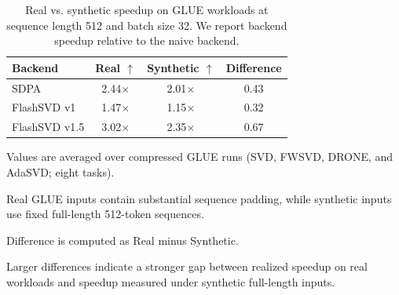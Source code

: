 \begin{table}[t]
\centering
\small
\setlength{\tabcolsep}{29pt}
\renewcommand{\arraystretch}{1.08}
\begin{threeparttable}
\caption{
Real vs. synthetic speedup on GLUE workloads at sequence length 512 and batch size 32.
We report backend speedup relative to the naive backend.
}
\label{tab:real_vs_synth_gap}
\begin{tabular}{lccc}
\toprule
Backend & Real $\uparrow$ & Synthetic $\uparrow$ & Difference \\
\midrule
SDPA          & 2.44$\times$ & 2.01$\times$ & 0.43 \\
FlashSVD v1   & 1.47$\times$ & 1.15$\times$ & 0.32 \\
FlashSVD v1.5 & 3.02$\times$ & 2.35$\times$ & 0.67 \\
\bottomrule
\end{tabular}
\begin{tablenotes}[flushleft]
\footnotesize
\item Values are averaged over compressed GLUE runs (SVD, FWSVD, DRONE, and AdaSVD; eight tasks).
\item Real GLUE inputs contain substantial sequence padding, while synthetic inputs use fixed full-length 512-token sequences.
\item Difference is computed as Real minus Synthetic.
\item Larger differences indicate a stronger gap between realized speedup on real workloads and speedup measured under synthetic full-length inputs.
\end{tablenotes}
\end{threeparttable}
\end{table}
